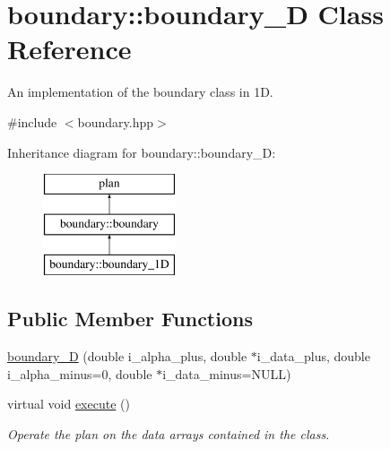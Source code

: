 \hypertarget{classboundary_1_1boundary__1_d}{\section{boundary\-:\-:boundary\-\_\-D Class Reference}
\label{classboundary_1_1boundary__1_d}
}


An implementation of the boundary class in 1\-D.  




{\ttfamily \#include $<$boundary.\-hpp$>$}

Inheritance diagram for boundary\-:\-:boundary\-\_\-D\-:\begin{figure}[H]
\begin{center}
\leavevmode
\includegraphics[height=3.000000cm]{classboundary_1_1boundary__1_d}
\end{center}
\end{figure}
\subsection*{Public Member Functions}
\begin{DoxyCompactItemize}
\item 
\hyperlink{classboundary_1_1boundary__1_d_a2c2b3a17cbe0b17fcf54f71104d0f312}{boundary\-\_\-D} (double i\-\_\-alpha\-\_\-plus, double $\ast$i\-\_\-data\-\_\-plus, double i\-\_\-alpha\-\_\-minus=0, double $\ast$i\-\_\-data\-\_\-minus=N\-U\-L\-L)
\begin{DoxyCompactList}\small\item\em \end{DoxyCompactList}\item 
virtual void \hyperlink{classboundary_1_1boundary__1_d_a10d56aff9623f0886de1d9f0eb991863}{execute} ()
\begin{DoxyCompactList}\small\item\em Operate the plan on the data arrays contained in the class. \end{DoxyCompactList}\end{DoxyCompactItemize}
